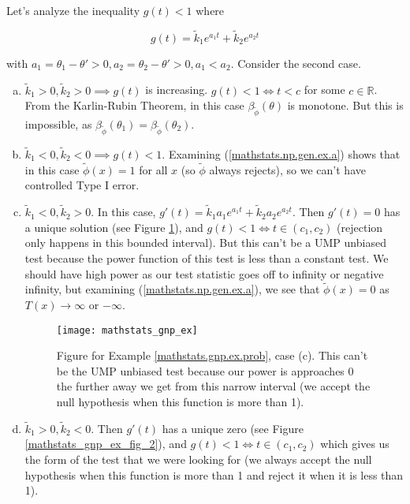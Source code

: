 \begin{solution}
Let's analyze the inequality \(g(t) < 1\) where 

\[
g(t) =  \tilde{k}_1e^{a_1 t } + \tilde{k}_2e^{a_2 t}
\]

with \(a_1 = \theta_1 - \theta' > 0, a_2 = \theta_2 - \theta' > 0, a_1 < a_2\). Consider the second case.

\begin{enumerate}[(a)]

\item \(\tilde{k}_1 > 0, \tilde{k}_2 > 0 \implies g(t)\) is increasing. \(g(t) < 1 \iff t< c\) for some \(c \in \mathbb{R}\). From the Karlin-Rubin Theorem, in this case \(\beta_{\tilde{\phi}}(\theta) \) is monotone. But this is impossible, as \(\beta_{\tilde{\phi}}(\theta_1) =  \beta_{\tilde{\phi}}(\theta_2)\).

\item \(\tilde{k}_1 < 0, \tilde{k}_2 < 0 \implies g(t) < 1\). Examining (\ref{mathstats.np.gen.ex.a}) shows that in this case \(\tilde{\phi}(x) = 1\) for all \(x\) (so \(\tilde{\phi}\) always rejects), so we can't have controlled Type I error.

\item \(\tilde{k}_1 < 0, \tilde{k}_2 > 0\). In this case, \(g'(t) = \tilde{k}_1 a_1 e^{a_1 t} + \tilde{k}_2 a_2 e^{a_2 t}\). Then \(g'(t) = 0\) has a unique solution (see Figure \ref{mathstats_gnp_ex_fig}), and \(g(t) < 1 \iff t \in (c_1, c_2)\) (rejection only happens in this bounded interval). But this can't be a UMP unbiased test because the power function of this test is less than a constant test. We should have high power as our test statistic goes off to infinity or negative infinity, but examining (\ref{mathstats.np.gen.ex.a}), we see that \(\tilde{\phi}(x)= 0\) as \(T(x) \to \infty\) or \(- \infty\).

\begin{figure}[htbp]
\begin{center}
\texttt{[image: mathstats\_gnp\_ex]}
\caption{Figure for Example \ref{mathstats.gnp.ex.prob}, case (c). This can't be the UMP unbiased test because our power is approaches 0 the further away we get from this narrow interval (we accept the null hypothesis when this function is more than 1).}
\label{mathstats_gnp_ex_fig}
\end{center}
\end{figure}

\item \(\tilde{k}_1 > 0, \tilde{k}_2 < 0\). Then \(g'(t)\) has a unique zero (see Figure \ref{mathstats_gnp_ex_fig_2}), and \(g(t) < 1 \iff t \in (c_1, c_2)\) which gives us the form of the test that we were looking for (we always accept the null hypothesis when this function is more than 1 and reject it when it is less than 1).


\end{enumerate}
\end{solution}

